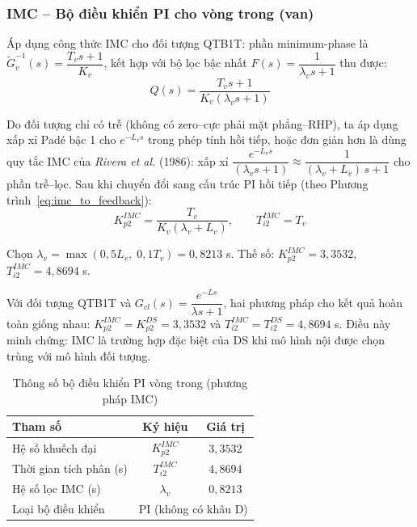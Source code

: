 \documentclass[../main.tex]{subfiles}
\begin{document}
\subsubsection{IMC -- Bộ điều khiển PI cho vòng trong (van)}

Áp dụng công thức IMC cho đối tượng QTB1T: phần minimum-phase là $\tilde{G}_v^{-1}(s) = \dfrac{T_v s + 1}{K_v}$, kết hợp với bộ lọc bậc nhất $F(s) = \dfrac{1}{\lambda_v s + 1}$ thu được:
\begin{equation}
    Q(s) = \frac{T_v s + 1}{K_v (\lambda_v s + 1)}
    \label{eq:imc_Q_inner}
\end{equation}

Do đối tượng chỉ có trễ (không có zero--cực phải mặt phẳng--RHP), ta áp dụng xấp xỉ Padé bậc 1 cho $e^{-L_v s}$ trong phép tính hồi tiếp, hoặc đơn giản hơn là dùng quy tắc IMC của \textit{Rivera et al.} (1986): xấp xỉ $\dfrac{e^{-L_v s}}{(\lambda_v s + 1)} \approx \dfrac{1}{(\lambda_v + L_v)\, s + 1}$ cho phần trễ--lọc. Sau khi chuyển đổi sang cấu trúc PI hồi tiếp (theo Phương trình~\ref{eq:imc_to_feedback}):
\begin{equation}
    K_{p2}^{IMC} = \frac{T_v}{K_v (\lambda_v + L_v)}, \qquad T_{i2}^{IMC} = T_v
    \label{eq:pi_parameters}
\end{equation}

Chọn $\lambda_v = \max(0{,}5L_v,\; 0{,}1T_v) = 0{,}8213$ s. Thế số: $K_{p2}^{IMC} = 3{,}3532$, $T_{i2}^{IMC} = 4{,}8694$ s.
\begin{tcolorbox}[colback=yellow!5!white, colframe=orange!75!black, title={Nhận xét quan hệ IMC -- DS (vòng trong)}]
Với đối tượng QTB1T và $G_{cl}(s) = \dfrac{e^{-Ls}}{\lambda s+1}$, hai phương pháp cho kết quả hoàn toàn giống nhau: $K_{p2}^{IMC} = K_{p2}^{DS} = 3{,}3532$ và $T_{i2}^{IMC} = T_{i2}^{DS} = 4{,}8694$ s. Điều này minh chứng: IMC là trường hợp đặc biệt của DS khi mô hình nội được chọn trùng với mô hình đối tượng.
\end{tcolorbox}

\begin{table}[H]
\centering
\caption{Thông số bộ điều khiển PI vòng trong (phương pháp IMC)}
\label{tab:tham_so_pi_van}
\begin{tabular}{|l|c|c|}
\hline
\textbf{Tham số} & \textbf{Ký hiệu} & \textbf{Giá trị}\\ \hline
Hệ số khuếch đại & $K_{p2}^{IMC}$ & $3{,}3532$\\ \hline
Thời gian tích phân (s) & $T_{i2}^{IMC}$ & $4{,}8694$\\ \hline
Hệ số lọc IMC (s) & $\lambda_v$ & $0{,}8213$\\ \hline
Loại bộ điều khiển & \multicolumn{2}{c|}{PI (không có khâu D)}\\ \hline
\end{tabular}
\end{table}
\end{document}
